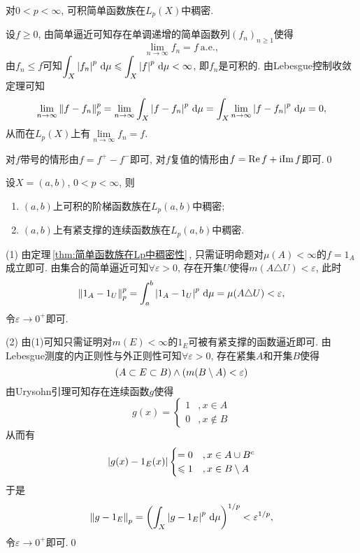 	\begin{Theorem}\label{thm:简单函数族在Lp中稠密性}
	对$ 0<p<\infty $, 可积简单函数族在$ L_p(X) $中稠密.
	\end{Theorem}
	\begin{Proof}
	设$ f\geqslant 0 $, 由简单逼近可知存在单调递增的简单函数列$ (f_n)_{n\geqslant 1} $使得
	\[
	\lim_{n\to\infty}f_n=f\ \text{a.e.},
	\]
	由$ f_n\leqslant f $可知$ \displaystyle\int_X\left| f_n \right| ^p\,\mathrm{d}\mu\leqslant\displaystyle\int_X\left| f \right| ^p\,\mathrm{d}\mu<\infty $, 即$ f_n $是可积的. 由Lebesgue控制收敛定理可知
	\[
	\lim_{n\to\infty}\left\| f-f_n \right\|_p^p=\lim_{n\to\infty}\int_X\left| f-f_n \right| ^p\,\mathrm{d}\mu=\int_X\lim_{n\to\infty}\left| f-f_n \right| ^p\,\mathrm{d}\mu=0,
	\]
	从而在$ L_p(X) $上有$ \lim\limits_{n\to\infty}f_n=f $.
	
	对$ f $带号的情形由$ f=f^+-f^- $即可, 对$ f $复值的情形由$ f=\mathrm{Re\,} f+\mathrm{i}\mathrm{Im\,} f $即可.\qed
	\end{Proof}
	
	\begin{Corollary}
	设$ X=(a,b) $, $ 0<p<\infty $, 则
	\begin{enumerate}[(1)]
	\item $ (a,b) $上可积的阶梯函数族在$ L_p(a,b) $中稠密;
	\item $ (a,b) $上有紧支撑的连续函数族在$ L_p(a,b) $中稠密.
	\end{enumerate}
	\end{Corollary}
	\begin{Proof}
	(1) 由定理\,\ref{thm:简单函数族在Lp中稠密性}\,, 只需证明命题对$ \mu(A)<\infty $的$ f=1_A $成立即可. 由集合的简单逼近可知$ \forall\varepsilon>0 $, 存在开集$ U $使得$ m(A\triangle U)<\varepsilon $, 此时
	\[
	\left\| 1_A-1_U \right\|_p^p=\int_a^b\left| 1_A-1_U \right| ^p\,\mathrm{d}\mu=\mu(A\triangle U)<\varepsilon,
	\]
	令$ \varepsilon\to 0^+ $即可.
	
	(2) 由(1)可知只需证明对$ m(E)<\infty $的$ 1_E $可被有紧支撑的函数逼近即可. 由Lebesgue测度的内正则性与外正则性可知$ \forall\varepsilon>0 $, 存在紧集$ A $和开集$ B $使得
	\[
	(A\subset E\subset B)\land(m(B\setminus A)<\varepsilon)
	\]
	由Urysohn引理可知存在连续函数$ g $使得
	\[
	g(x)=\begin{cases}
	1 & ,x\in A\\0 & ,x\notin B
	\end{cases}
	\]
	从而有
	\[
	\left| g(x)-1_E(x) \right| \begin{cases}
	=0 & ,x\in A\cup B^c\\\leqslant 1 & ,x\in B\setminus A
	\end{cases}
	\]
	于是
	\[
	\left\| g-1_E \right\|_p=\left(\int_X\left| g-1_E \right| ^p\,\mathrm{d}\mu\right)^{1/p}<\varepsilon^{1/p},
	\]
	令$ \varepsilon\to 0^+ $即可.\qed
	\end{Proof}
	
